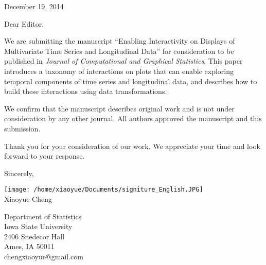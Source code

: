 \documentclass[11pt]{article}
\begin{document}
\begin{flushright}
December 19, 2014
\end{flushright}

Dear Editor,

We are submitting the manuscript ``Enabling Interactivity
on Displays of Multivariate Time Series and Longitudinal Data''
for consideration to be published in \textit{Journal
of Computational and Graphical Statistics}. This paper introduces
a taxonomy of interactions on plots that can enable exploring temporal
components of time series and longitudinal data, and describes how
to build these interactions using data transformations.

We confirm that the manuscript describes original work and is not
under consideration by any other journal. All authors approved the
manuscript and this submission.

Thank you for your consideration of our work. We appreciate your time
and look forward to your response. 

\bigskip{}

Sincerely,

\texttt{[image: /home/xiaoyue/Documents/signiture\_English.JPG]}\\
Xiaoyue Cheng

Department of Statistics\\
Iowa State University\\
2406 Snedecor Hall\\
Ames, IA 50011\\
chengxiaoyue@gmail.com
\end{document}
